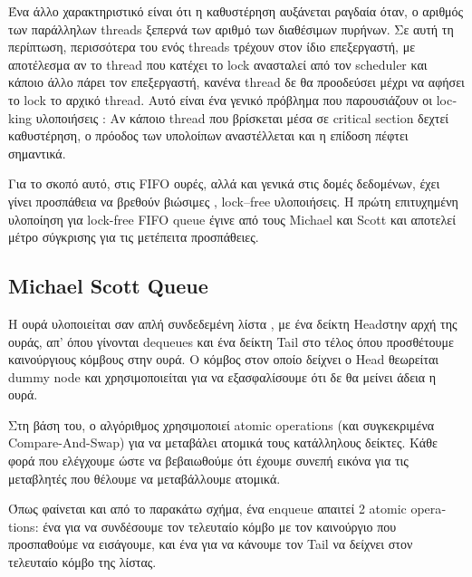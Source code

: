 Ένα άλλο χαρακτηριστικό είναι ότι η καθυστέρηση αυξάνεται ραγδαία όταν, ο αριθμός των παράλληλων \textlatin{threads} ξεπερνά των αριθμό των διαθέσιμων πυρήνων. Σε αυτή τη περίπτωση, περισσότερα του ενός \textlatin{threads} τρέχουν στον ίδιο επεξεργαστή, με αποτέλεσμα αν το \textlatin{thread} που κατέχει το \textlatin{lock}  ανασταλεί από τον \textlatin{scheduler} και κάποιο άλλο πάρει τον επεξεργαστή, κανένα \textlatin{thread}  δε θα προοδεύσει μέχρι να αφήσει το \textlatin{lock} το αρχικό \textlatin{thread}. Αυτό είναι ένα γενικό πρόβλημα που παρουσιάζουν οι \textlatin{locking} υλοποιήσεις : Αν κάποιο \textlatin{thread}  που βρίσκεται μέσα σε \textlatin{critical section} δεχτεί καθυστέρηση, ο πρόοδος των υπολοίπων αναστέλλεται και η επίδοση πέφτει σημαντικά.


Για το σκοπό αυτό, στις \textlatin{FIFO} ουρές, αλλά και γενικά στις δομές δεδομένων, έχει γίνει προσπάθεια  να βρεθούν βιώσιμες , \textlatin{lock–free} υλοποιήσεις. Η πρώτη επιτυχημένη υλοποίηση για \textlatin{lock-free FIFO queue} έγινε από τους \textlatin{Michael} και \textlatin{Scott} \cite{msqueue}και αποτελεί μέτρο σύγκρισης για τις μετέπειτα προσπάθειες.

\subsection{\textlatin{Michael Scott Queue}}

Η ουρά υλοποιείται σαν απλή συνδεδεμένη λίστα , με ένα δείκτη \textlatin{Head}στην αρχή της ουράς, απ’ όπου γίνονται \textlatin{dequeues} και ένα δείκτη \textlatin{Tail} στο τέλος όπου προσθέτουμε καινούργιους κόμβους στην ουρά. Ο κόμβος στον οποίο δείχνει ο \textlatin{Head} θεωρείται \textlatin{dummy node} και χρησιμοποιείται για να εξασφαλίσουμε ότι δε θα μείνει άδεια η ουρά.

Στη βάση του, ο αλγόριθμος χρησιμοποιεί atomic \textlatin{operations} (και συγκεκριμένα \textlatin{Compare-And-Swap}) για να μεταβάλει ατομικά τους κατάλληλους δείκτες.  Κάθε φορά που ελέγχουμε ώστε να βεβαιωθούμε ότι έχουμε συνεπή εικόνα για τις μεταβλητές που θέλουμε να μεταβάλλουμε ατομικά.

 Όπως φαίνεται και από το παρακάτω σχήμα, ένα \textlatin{enqueue} απαιτεί 2 \textlatin{atomic operations}: ένα για να συνδέσουμε τον τελευταίο κόμβο με τον καινούργιο που προσπαθούμε να εισάγουμε, και ένα για να κάνουμε τον \textlatin{Tail} να δείχνει στον τελευταίο κόμβο της λίστας.

